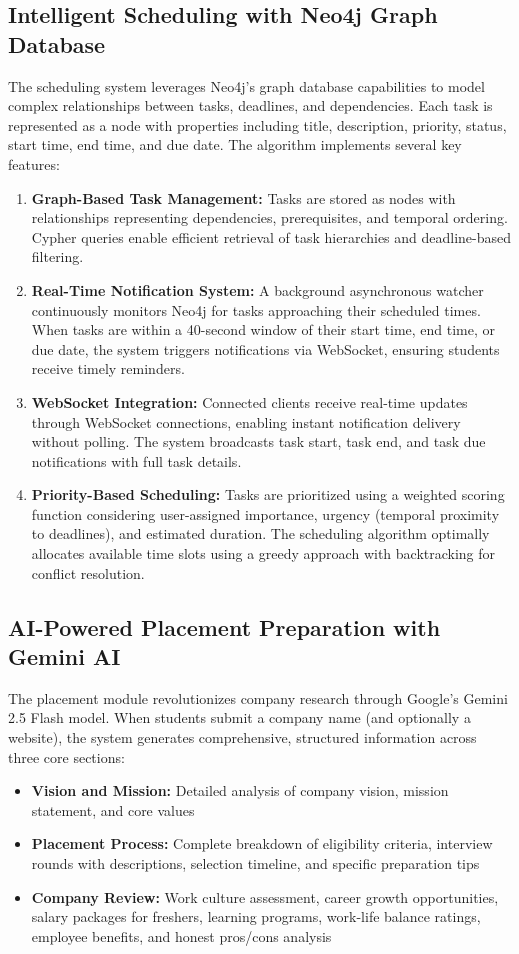 \documentclass[conference]{IEEEtran}
\begin{document}
\subsection{Intelligent Scheduling with Neo4j Graph Database}
The scheduling system leverages Neo4j's graph database capabilities to model complex relationships between tasks, deadlines, and dependencies. Each task is represented as a node with properties including title, description, priority, status, start time, end time, and due date. The algorithm implements several key features:
\begin{enumerate}
    \item \textbf{Graph-Based Task Management:} Tasks are stored as nodes with relationships representing dependencies, prerequisites, and temporal ordering. Cypher queries enable efficient retrieval of task hierarchies and deadline-based filtering.
    \item \textbf{Real-Time Notification System:} A background asynchronous watcher continuously monitors Neo4j for tasks approaching their scheduled times. When tasks are within a 40-second window of their start time, end time, or due date, the system triggers notifications via WebSocket, ensuring students receive timely reminders.
    \item \textbf{WebSocket Integration:} Connected clients receive real-time updates through WebSocket connections, enabling instant notification delivery without polling. The system broadcasts task start, task end, and task due notifications with full task details.
    \item \textbf{Priority-Based Scheduling:} Tasks are prioritized using a weighted scoring function considering user-assigned importance, urgency (temporal proximity to deadlines), and estimated duration. The scheduling algorithm optimally allocates available time slots using a greedy approach with backtracking for conflict resolution.
\end{enumerate}

\subsection{AI-Powered Placement Preparation with Gemini AI}
The placement module revolutionizes company research through Google's Gemini 2.5 Flash model. When students submit a company name (and optionally a website), the system generates comprehensive, structured information across three core sections:
\begin{itemize}
    \item \textbf{Vision and Mission:} Detailed analysis of company vision, mission statement, and core values
    \item \textbf{Placement Process:} Complete breakdown of eligibility criteria, interview rounds with descriptions, selection timeline, and specific preparation tips
    \item \textbf{Company Review:} Work culture assessment, career growth opportunities, salary packages for freshers, learning programs, work-life balance ratings, employee benefits, and honest pros/cons analysis
\end{itemize}
\end{document}
